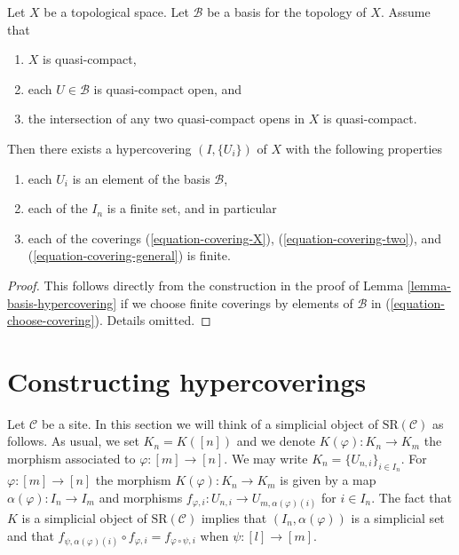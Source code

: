 \begin{lemma}
\label{lemma-quasi-separated-quasi-compact-hypercovering}
Let $X$ be a topological space.
Let $\mathcal{B}$ be a basis for the topology of $X$.
Assume that
\begin{enumerate}
\item $X$ is quasi-compact,
\item each $U \in \mathcal{B}$ is quasi-compact open, and
\item the intersection of any two quasi-compact opens in
$X$ is quasi-compact.
\end{enumerate}
Then there exists a hypercovering $(I, \{U_i\})$ of $X$ with the
following properties
\begin{enumerate}
\item each $U_i$ is an element of the basis $\mathcal{B}$,
\item each of the $I_n$ is a finite set, and in particular
\item each of the coverings  (\ref{equation-covering-X}),
(\ref{equation-covering-two}), and (\ref{equation-covering-general})
is finite.
\end{enumerate}
\end{lemma}

\begin{proof}
This follows directly from the construction in the proof of
Lemma \ref{lemma-basis-hypercovering} if we choose finite coverings
by elements of $\mathcal{B}$ in (\ref{equation-choose-covering}).
Details omitted.
\end{proof}







\section{Constructing hypercoverings}
\label{section-hypercovering-sites}

\noindent
Let $\mathcal{C}$ be a site. In this section we will think of a
simplicial object of $\text{SR}(\mathcal{C})$ as follows.
As usual, we set $K_n = K([n])$ and we denote $K(\varphi) : K_n \to K_m$
the morphism associated to $\varphi : [m] \to [n]$.
We may write $K_n = \{U_{n, i}\}_{i \in I_n}$. For
$\varphi : [m] \to [n]$ the morphism $K(\varphi) : K_n \to K_m$
is given by a map $\alpha(\varphi) : I_n \to I_m$ and morphisms
$f_{\varphi, i} : U_{n, i} \to U_{m, \alpha(\varphi)(i)}$
for $i \in I_n$. The fact that $K$ is a simplicial object of
$\text{SR}(\mathcal{C})$ implies that $(I_n, \alpha(\varphi))$
is a simplicial set
and that $f_{\psi, \alpha(\varphi)(i)} \circ f_{\varphi, i} =
f_{\varphi \circ \psi, i}$ when $\psi : [l] \to [m]$.

